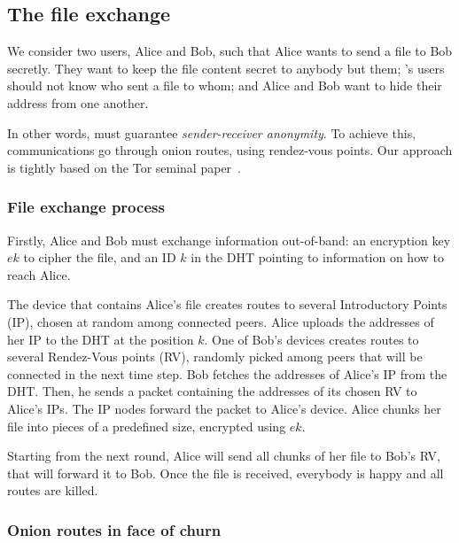 \subsection{The file exchange}%
\label{file-exchange}

We consider two users, Alice and Bob, such that Alice wants to send a file to Bob secretly.
They want to keep the file content secret to anybody but them; \name's users should not know who sent a file to whom; and Alice and Bob want to hide their address from one another.

In other words, \name must guarantee \emph{sender-receiver anonymity}.
To achieve this, communications go through onion routes, using rendez-vous points.
Our approach is tightly based on the Tor seminal paper~\cite{Tor}.

\subsubsection{File exchange process}%
\label{ssub:file_exchange_process}

Firstly, Alice and Bob must exchange information out-of-band: an encryption key $ek$ to cipher the file, and an ID $k$ in the DHT pointing to information on how to reach Alice.

The device that contains Alice's file  creates routes to several Introductory Points (IP), chosen at random among connected peers.
Alice uploads the addresses of her IP to the DHT at the position $k$.
One of Bob's devices creates routes to several Rendez-Vous points (RV), randomly picked among peers that will be connected in the next time step.
Bob fetches the addresses of Alice's IP from the \ac{DHT}.
Then, he sends a packet containing the addresses of its chosen RV to Alice's IPs.
The IP nodes forward the packet to Alice's device. 
Alice chunks her file into pieces of a predefined size, encrypted using $ek$.

Starting from the next round, Alice will send all chunks of her file to Bob's RV, that will forward it to Bob.
Once the file is received, everybody is happy and all routes are killed.


\subsubsection{Onion routes in face of churn}%
\label{ssub:onion_routes_in_face_of_churn}

